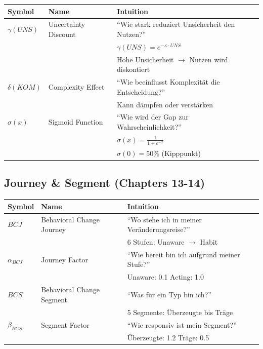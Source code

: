 \begin{longtable}{p{2cm}p{4cm}p{7cm}}
\toprule
\textbf{Symbol} & \textbf{Name} & \textbf{Intuition} \\
\midrule
\endhead

$\gamma(UNS)$ & Uncertainty Discount & 
``Wie stark reduziert Unsicherheit den Nutzen?'' \\
& & $\gamma(UNS) = e^{-\kappa \cdot UNS}$ \\
& & Hohe Unsicherheit $\to$ Nutzen wird diskontiert \\[6pt]

$\delta(KOM)$ & Complexity Effect & 
``Wie beeinflusst Komplexität die Entscheidung?'' \\
& & Kann dämpfen oder verstärken \\[6pt]

$\sigma(x)$ & Sigmoid Function & 
``Wie wird der Gap zur Wahrscheinlichkeit?'' \\
& & $\sigma(x) = \frac{1}{1 + e^{-x}}$ \\
& & $\sigma(0) = 50\%$ (Kipppunkt) \\[6pt]

\bottomrule
\end{longtable}

\subsection{Journey \& Segment (Chapters 13-14)}

\begin{longtable}{p{2cm}p{4cm}p{7cm}}
\toprule
\textbf{Symbol} & \textbf{Name} & \textbf{Intuition} \\
\midrule
\endhead

$BCJ$ & Behavioral Change Journey & 
``Wo stehe ich in meiner Veränderungsreise?'' \\
& & 6 Stufen: Unaware $\to$ Habit \\[6pt]

$\alpha_{BCJ}$ & Journey Factor & 
``Wie bereit bin ich aufgrund meiner Stufe?'' \\
& & Unaware: 0.1 \quad Acting: 1.0 \\[6pt]

$BCS$ & Behavioral Change Segment & 
``Was für ein Typ bin ich?'' \\
& & 5 Segmente: Überzeugte bis Träge \\[6pt]

$\beta_{BCS}$ & Segment Factor & 
``Wie responsiv ist mein Segment?'' \\
& & Überzeugte: 1.2 \quad Träge: 0.5 \\[6pt]

\bottomrule
\end{longtable}

